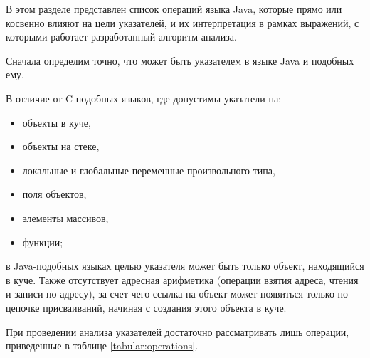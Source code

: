 \documentclass[14pt,titlepage]{extarticle}
\newcommand{\eng}[1]{{\English#1}}
\newcommand{\java}{\eng{Java}\xspace}
\begin{document}
      В этом разделе представлен список операций языка \java, которые прямо или
      косвенно влияют на цели указателей, и их интерпретация в рамках
      выражений, с которыми работает разработанный алгоритм анализа.

      Сначала определим точно, что может быть указателем в языке \java и
      подобных ему.

      В отличие от C-подобных языков, где допустимы указатели на:
      \begin{itemize}
        \item объекты в куче,
        \item объекты на стеке,
        \item локальные и глобальные переменные произвольного типа,
        \item поля объектов,
        \item элементы массивов,
        \item функции;
      \end{itemize}
      в \java-подобных языках целью указателя может быть только объект,
      находящийся в куче. Также отсутствует адресная арифметика (операции
      взятия адреса, чтения и записи по адресу), за счет чего ссылка на объект
      может появиться только по цепочке присваиваний, начиная с создания этого
      объекта в куче.

      При проведении анализа указателей достаточно рассматривать лишь
      операции, приведенные в таблице \ref{tabular:operations}.
\end{document}
